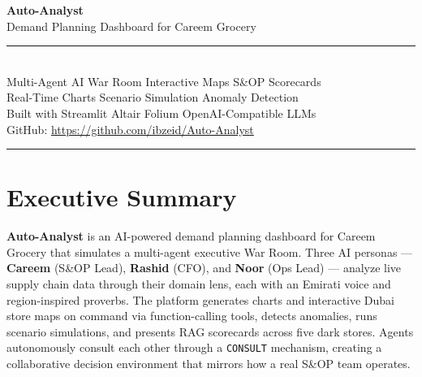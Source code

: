 \documentclass[11pt,a4paper]{article}
\begin{document}
\thispagestyle{empty}
\begin{center}
\vspace*{3cm}

{\fontsize{42}{48}\selectfont\color{CareemGreen}\textbf{Auto-Analyst}}\\[0.5cm]
{\Large\color{DarkEmerald}Demand Planning Dashboard for Careem Grocery}\\[1.5cm]

{\color{MidText}\rule{0.5\textwidth}{1pt}}\\[1.5cm]

{\large\color{DarkEmerald}Multi-Agent AI War Room \textbullet{} Interactive Maps \textbullet{} S\&OP Scorecards}\\[0.4cm]
{\large\color{DarkEmerald}Real-Time Charts \textbullet{} Scenario Simulation \textbullet{} Anomaly Detection}\\[2.5cm]

{\footnotesize\color{MidText}Built with Streamlit \textbullet{} Altair \textbullet{} Folium \textbullet{} OpenAI-Compatible LLMs}\\[0.3cm]
{\footnotesize\color{MidText}GitHub: \url{https://github.com/ibzeid/Auto-Analyst}}
\end{center}

\vfill
\begin{center}
\textcolor{MidText}{\rule{0.3\textwidth}{0.5pt}}
\end{center}
\newpage

\section{Executive Summary}

\begin{infobox}
\textbf{Auto-Analyst} is an AI-powered demand planning dashboard for Careem Grocery that simulates a multi-agent executive War Room. Three AI personas --- \textcolor{CareemGreen}{\textbf{Careem}} (S\&OP Lead), \textcolor{RashidGold}{\textbf{Rashid}} (CFO), and \textcolor{NoorBlue}{\textbf{Noor}} (Ops Lead) --- analyze live supply chain data through their domain lens, each with an Emirati voice and region-inspired proverbs. The platform generates charts and interactive Dubai store maps on command via function-calling tools, detects anomalies, runs scenario simulations, and presents RAG scorecards across five dark stores. Agents autonomously consult each other through a \texttt{CONSULT} mechanism, creating a collaborative decision environment that mirrors how a real S\&OP team operates.
\end{infobox}
\end{document}

